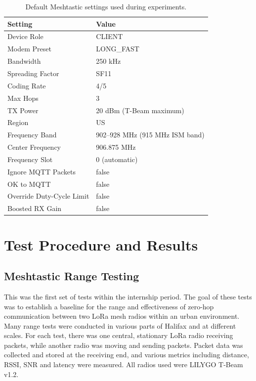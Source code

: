 \documentclass[11pt]{article}
\begin{document}
\begin{table}[htbp]
    \centering
    \caption{Default Meshtastic settings used during experiments.}
    \label{tab:default-settings}
    \begin{tabularx}{\textwidth}{lX}
        \toprule
        \textbf{Setting} & \textbf{Value} \\
        \midrule
        Device Role & CLIENT \\
        Modem Preset & LONG\_FAST \\
        Bandwidth & 250 kHz \\
        Spreading Factor & SF11 \\
        Coding Rate & 4/5 \\
        Max Hops & 3 \\
        TX Power & 20 dBm (T-Beam maximum) \\
        Region & US \\
        Frequency Band & 902--928 MHz (915 MHz ISM band) \\
        Center Frequency & 906.875 MHz \\
        Frequency Slot & 0 (automatic) \\
        Ignore MQTT Packets & false \\
        OK to MQTT & false \\
        Override Duty-Cycle Limit & false \\
        Boosted RX Gain & false \\
        \bottomrule
    \end{tabularx}
\end{table}

\FloatBarrier
\section{Test Procedure and Results}
\subsection{Meshtastic Range Testing}

This was the first set of tests within the internship period. The goal of these tests was to establish a baseline for the range and effectiveness of zero-hop communication between two LoRa mesh radios within an urban environment. Many range tests were conducted in various parts of Halifax and at different scales. For each test, there was one central, stationary LoRa radio receiving packets, while another radio was moving and sending packets. Packet data was collected and stored at the receiving end, and various metrics including distance, RSSI, SNR and latency were measured. All radios used were LILYGO T-Beam v1.2.
\end{document}

